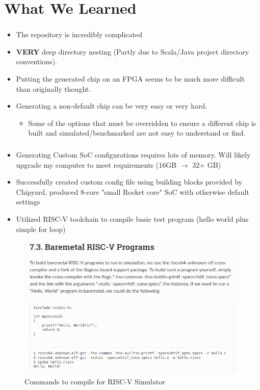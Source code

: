 \documentclass{../weeklyslides}
\begin{document}
\section{What We Learned}\label{sec:What_We_Learned}
\begin{frame}
  \frametitle{}
  \begin{itemize}
  \item The repository is incredibly complicated
  \item \textbf{VERY} deep directory nesting (Partly due to Scala/Java project directory conventions).
  \item Putting the generated chip on an FPGA seems to be much more difficult than originally thought.
  \item Generating a non-default chip can be very easy or very hard.
    \begin{itemize}
    \item Some of the options that must be overridden to ensure a different chip is built and simulated/benchmarked are not easy to understand or find.
    \end{itemize}
  \end{itemize}
\end{frame}
\begin{frame}
	\frametitle{}
	\begin{itemize}
	\item Generating Custom SoC configurations requires lots of memory. Will likely upgrade my computer to meet requirements (16GB $\rightarrow$ 32+ GB)
	\item Successfully created custom config file using building blocks provided by Chipyard, produced 8-core "small Rocket core" SoC with otherwise default settings
	\item Utilized RISC-V toolchain to compile basic test program (hello world plus simple for loop)
	\end{itemize}
\end{frame}

\begin{frame}
	
\begin{figure}
	\centering
	\includegraphics[width=0.9\linewidth]{"Baremetal RISCV instr"}
	\caption{Commands to compile for RISC-V Simulator}
	\label{fig:baremetal-riscv-instr}
\end{figure}

\end{frame}
\end{document}
